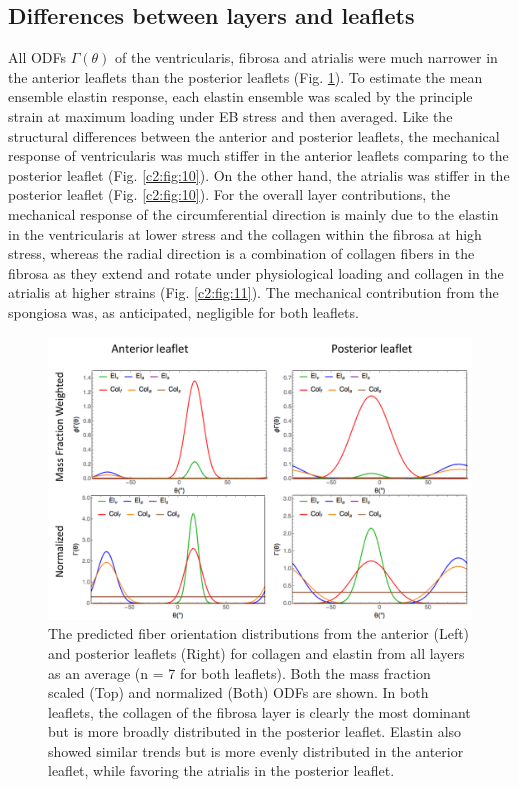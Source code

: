 \subsection{Differences between layers and leaflets}

    All ODFs $\Gamma(\theta)$ of the ventricularis, fibrosa and atrialis were much narrower in the anterior leaflets than the posterior leaflets (Fig. \ref{c2:fig:9}). To estimate the mean ensemble elastin response, each elastin ensemble was scaled by the principle strain at maximum loading under EB stress and then averaged. Like the structural differences between the anterior and posterior leaflets, the mechanical response of ventricularis was much stiffer in the anterior leaflets comparing to the posterior leaflet (Fig. \ref{c2:fig:10}). On the other hand, the atrialis was stiffer in the posterior leaflet (Fig. \ref{c2:fig:10}). For the overall layer contributions, the mechanical response of the circumferential direction is mainly due to the elastin in the ventricularis at lower stress and the collagen within the fibrosa at high stress, whereas the radial direction is a combination of collagen fibers in the fibrosa as they extend and rotate under physiological loading and collagen in the atrialis at higher strains (Fig. \ref{c2:fig:11}). The mechanical contribution from the spongiosa was, as anticipated, negligible for both leaflets.
    
    
\begin{figure}
\centering
\includegraphics[width=\textwidth]{Images/chapter2/figure9.pdf}
\caption{The predicted fiber orientation distributions from the anterior (Left) and posterior leaflets (Right) for collagen and elastin from all layers as an average (n = 7 for both leaflets). Both the mass fraction scaled (Top) and normalized (Both) ODFs are shown. In both leaflets, the collagen of the fibrosa layer is clearly the most dominant but is more broadly distributed in the posterior leaflet. Elastin also showed similar trends but is more evenly distributed in the anterior leaflet, while favoring the atrialis in the posterior leaflet.}
\label{c2:fig:9}
\end{figure}


